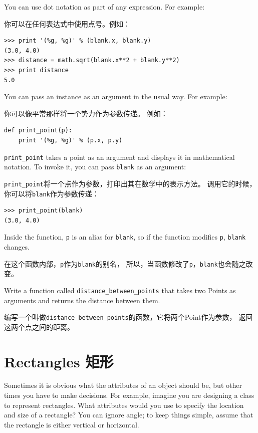 \documentclass[10pt]{book}
\begin{document}
\begin{CJK}{UTF8}{gbsn}
You can use dot notation as part of any expression.  For example:

你可以在任何表达式中使用点号。例如：

\begin{verbatim}
>>> print '(%g, %g)' % (blank.x, blank.y)
(3.0, 4.0)
>>> distance = math.sqrt(blank.x**2 + blank.y**2)
>>> print distance
5.0
\end{verbatim}
%
You can pass an instance as an argument in the usual way.
For example:

你可以像平常那样将一个势力作为参数传递。
例如：

\begin{verbatim}
def print_point(p):
    print '(%g, %g)' % (p.x, p.y)
\end{verbatim}
%
\verb"print_point" takes a point as an argument and displays it in
mathematical notation.  To invoke it, you can pass {\tt blank} as
an argument:

\verb"print_point"将一个点作为参数，打印出其在数学中的表示方法。
调用它的时候，你可以将{\tt blank}作为参数传递：

\begin{verbatim}
>>> print_point(blank)
(3.0, 4.0)
\end{verbatim}
%
Inside the function, {\tt p} is an alias for {\tt blank}, so if
the function modifies {\tt p}, {\tt blank} changes.

在这个函数内部，{\tt p}作为{\tt blank}的别名，
所以，当函数修改了{\tt p}，{\tt blank}也会随之改变。


\begin{exercise}

Write a function called \verb"distance_between_points" that takes two
Points as arguments and returns the distance between them.

编写一个叫做\verb"distance_between_points"的函数，它将两个Point作为参数，
返回这两个点之间的距离。

\end{exercise}



\section{Rectangles 矩形}
\label{rectangles}

Sometimes it is obvious what the attributes of an object should be,
but other times you have to make decisions.  For example, imagine you
are designing a class to represent rectangles.  What attributes would
you use to specify the location and size of a rectangle?  You can
ignore angle; to keep things simple, assume that the rectangle is
either vertical or horizontal.


\end{CJK}
\end{document}
